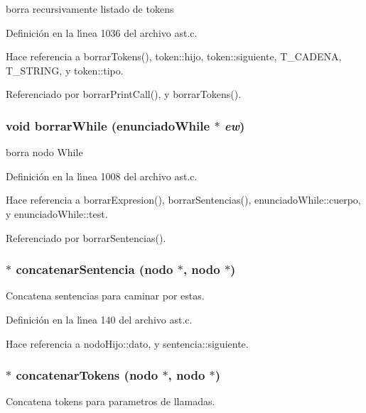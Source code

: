 borra recursivamente listado de tokens 



Definici\'{o}n en la l\'{\i}nea 1036 del archivo ast.c.

Hace referencia a borrar\-Tokens(), token::hijo, token::siguiente, T\_\-CADENA, T\_\-STRING, y token::tipo.

Referenciado por borrar\-Print\-Call(), y borrar\-Tokens().
\subsubsection{\setlength{\rightskip}{0pt plus 5cm}void borrar\-While ({\bf enunciado\-While} $\ast$ {\em ew})}\label{ast_8h_a67}


borra nodo While 



Definici\'{o}n en la l\'{\i}nea 1008 del archivo ast.c.

Hace referencia a borrar\-Expresion(), borrar\-Sentencias(), enunciado\-While::cuerpo, y enunciado\-While::test.

Referenciado por borrar\-Sentencias().
\subsubsection{$\ast$ concatenar\-Sentencia ({\bf nodo} $\ast$, {\bf nodo} $\ast$)}\label{ast_8h_a32}


Concatena sentencias para caminar por estas. 



Definici\'{o}n en la l\'{\i}nea 140 del archivo ast.c.

Hace referencia a nodo\-Hijo::dato, y sentencia::siguiente.
\subsubsection{$\ast$ concatenar\-Tokens ({\bf nodo} $\ast$, {\bf nodo} $\ast$)}\label{ast_8h_a31}


Concatena tokens para parametros de llamadas. 



